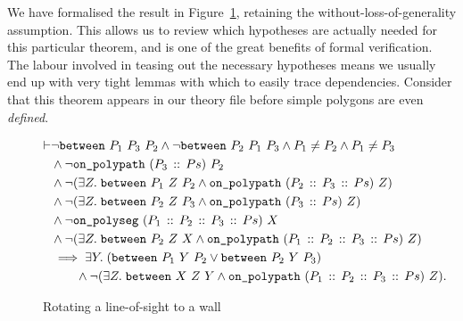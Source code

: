 We have formalised the result in Figure~\ref{fig:RotateToWall}, retaining the without-loss-of-generality assumption. This allows us to review which hypotheses are actually needed for this particular theorem, and is one of the great benefits of formal verification. The labour involved in teasing out the necessary hypotheses means we usually end up with very tight lemmas with which to easily trace dependencies. Consider that this theorem appears in our theory file before simple polygons are even \emph{defined}.

\begin{figure}
\begin{equation}\label{eq:RotateToWall}
  \begin{split}
\vdash&\neg\texttt{between}\ P_1\ P_3\ P_2 \wedge \neg\texttt{between}\ P_2\ P_1\ P_3 \wedge P_1 \neq P_2 \wedge P_1 \neq P_3\\
    &\wedge\neg\texttt{on\_polypath}\ (P_3\,::\,Ps)\ P_2\\
    &\wedge\neg(\exists Z.\; \texttt{between}\ P_1\ Z\ P_2 \wedge \texttt{on\_polypath}\ (P_2\,::\,P_3\,::\,Ps)\ Z)\\
    &\wedge\neg(\exists Z.\; \texttt{between}\ P_2\ Z\ P_3 \wedge \texttt{on\_polypath}\ (P_3\,::\,Ps)\ Z)\\
    &\wedge\neg\texttt{on\_polyseg}\ (P_1\,::\,P_2\,::\,P_3\,::\,Ps)\ X\\
    &\wedge\neg(\exists Z.\; \texttt{between}\ P_2\ Z\ X \wedge \texttt{on\_polypath}\ (P_1\,::\,P_2\,::\,P_3\,::\,Ps)\ Z)\\
    &\implies\exists Y.\; (\texttt{between}\ P_1\ Y\ P_2 \vee \texttt{between}\ P_2\ Y\ P_3)\\
    &\qquad \wedge \neg(\exists Z.\; \texttt{between}\ X\ Z\ Y \wedge \texttt{on\_polypath}\ (P_1\,::\,P_2\,::\,P_3\,::\,Ps)\ Z).
  \end{split}
\end{equation}
\caption{Rotating a line-of-sight to a wall}
\label{fig:RotateToWall}
\end{figure}

